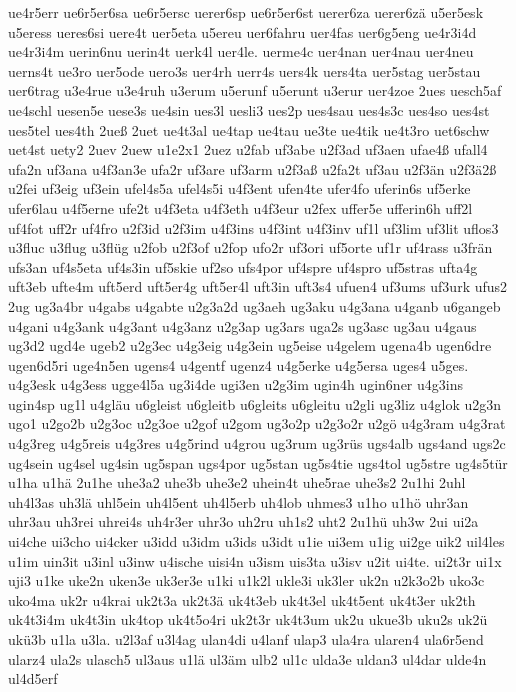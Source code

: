 {ue4r5err
ue6r5er6sa
ue6r5ersc
uerer6sp
ue6r5er6st
uerer6za
uerer6zä
u5er5esk
u5eress
ueres6si
uere4t
uer5eta
u5ereu
uer6fahru
uer4fas
uer6g5eng
ue4r3i4d
ue4r3i4m
uerin6nu
uerin4t
uerk4l
uer4le.
uerme4c
uer4nan
uer4nau
uer4neu
uerns4t
ue3ro
uer5ode
uero3s
uer4rh
uerr4s
uers4k
uers4ta
uer5stag
uer5stau
uer6trag
u3e4rue
u3e4ruh
u3erum
u5erunf
u5erunt
u3erur
uer4zoe
2ues
uesch5af
ue4schl
uesen5e
uese3s
ue4sin
ues3l
uesli3
ues2p
ues4sau
ues4s3c
ues4so
ues4st
ues5tel
ues4th
2ueß
2uet
ue4t3al
ue4tap
ue4tau
ue3te
ue4tik
ue4t3ro
uet6schw
uet4st
uety2
2uev
2uew
u1e2x1
2uez
u2fab
uf3abe
u2f3ad
uf3aen
ufae4ß
ufall4
ufa2n
uf3ana
u4f3an3e
ufa2r
uf3are
uf3arm
u2f3aß
u2fa2t
uf3au
u2f3än
u2f3ä2ß
u2fei
uf3eig
uf3ein
ufel4s5a
ufel4s5i
u4f3ent
ufen4te
ufer4fo
uferin6s
uf5erke
ufer6lau
u4f5erne
ufe2t
u4f3eta
u4f3eth
u4f3eur
u2fex
uffer5e
ufferin6h
uff2l
uf4fot
uff2r
uf4fro
u2f3id
u2f3im
u4f3ins
u4f3int
u4f3inv
uf1l
uf3lim
uf3lit
uflos3
u3fluc
u3flug
u3flüg
u2fob
u2f3of
u2fop
ufo2r
uf3ori
uf5orte
uf1r
uf4rass
u3frän
ufs3an
uf4s5eta
uf4s3in
uf5skie
uf2so
ufs4por
uf4spre
uf4spro
uf5stras
ufta4g
uft3eb
ufte4m
uft5erd
uft5er4g
uft5er4l
uft3in
uft3s4
ufuen4
uf3ums
uf3urk
ufus2
2ug
ug3a4br
u4gabs
u4gabte
u2g3a2d
ug3aeh
ug3aku
u4g3ana
u4ganb
u6gangeb
u4gani
u4g3ank
u4g3ant
u4g3anz
u2g3ap
ug3ars
uga2s
ug3asc
ug3au
u4gaus
ug3d2
ugd4e
ugeb2
u2g3ec
u4g3eig
u4g3ein
ug5eise
u4gelem
ugena4b
ugen6dre
ugen6d5ri
uge4n5en
ugens4
u4gentf
ugenz4
u4g5erke
u4g5ersa
uges4
u5ges.
u4g3esk
u4g3ess
ugge4l5a
ug3i4de
ugi3en
u2g3im
ugin4h
ugin6ner
u4g3ins
ugin4sp
ug1l
u4gläu
u6gleist
u6gleitb
u6gleits
u6gleitu
u2gli
ug3liz
u4glok
u2g3n
ugo1
u2go2b
u2g3oc
u2g3oe
u2gof
u2gom
ug3o2p
u2g3o2r
u2gö
u4g3ram
u4g3rat
u4g3reg
u4g5reis
u4g3res
u4g5rind
u4grou
ug3rum
ug3rüs
ugs4alb
ugs4and
ugs2c
ug4sein
ug4sel
ug4sin
ug5span
ugs4por
ug5stan
ug5s4tie
ugs4tol
ug5stre
ug4s5tür
u1ha
u1hä
2u1he
uhe3a2
uhe3b
uhe3e2
uhein4t
uhe5rae
uhe3s2
2u1hi
2uhl
uh4l3as
uh3lä
uhl5ein
uh4l5ent
uh4l5erb
uh4lob
uhmes3
u1ho
u1hö
uhr3an
uhr3au
uh3rei
uhrei4s
uh4r3er
uhr3o
uh2ru
uh1s2
uht2
2u1hü
uh3w
2ui
ui2a
ui4che
ui3cho
ui4cker
u3idd
u3idm
u3ids
u3idt
u1ie
ui3em
u1ig
ui2ge
uik2
uil4les
u1im
uin3it
u3inl
u3inw
u4ische
uisi4n
u3ism
uis3ta
u3isv
u2it
ui4te.
ui2t3r
ui1x
uji3
u1ke
uke2n
uken3e
uk3er3e
u1ki
u1k2l
ukle3i
uk3ler
uk2n
u2k3o2b
uko3c
uko4ma
uk2r
u4krai
uk2t3a
uk2t3ä
uk4t3eb
uk4t3el
uk4t5ent
uk4t3er
uk2th
uk4t3i4m
uk4t3in
uk4top
uk4t5o4ri
uk2t3r
uk4t3um
uk2u
ukue3b
uku2s
uk2ü
ukü3b
u1la
u3la.
u2l3af
u3l4ag
ulan4di
u4lanf
ulap3
ula4ra
ularen4
ula6r5end
ularz4
ula2s
ulasch5
ul3aus
u1lä
ul3äm
ulb2
ul1c
ulda3e
uldan3
ul4dar
ulde4n
ul4d5erf
}
